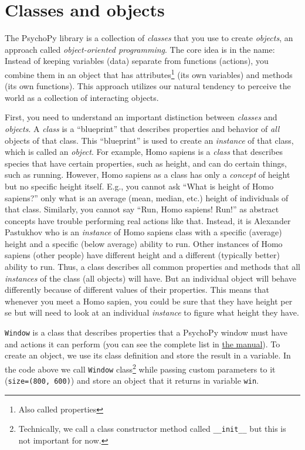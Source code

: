 \documentclass[
]{book}
\begin{document}
\hypertarget{classes-and-objects}{%
\section{Classes and objects}\label{classes-and-objects}}

The PsychoPy library is a collection of \emph{classes} that you use to create \emph{objects}, an approach called \emph{object-oriented programming}. The core idea is in the name: Instead of keeping variables (data) separate from functions (actions), you combine them in an object that has attributes\footnote{Also called properties} (its own variables) and methods (its own functions). This approach utilizes our natural tendency to perceive the world as a collection of interacting objects.

First, you need to understand an important distinction between \emph{classes} and \emph{objects}. A \emph{class} is a ``blueprint'' that describes properties and behavior of \emph{all} objects of that class. This ``blueprint'' is used to create an \emph{instance} of that class, which is called an \emph{object}. For example, Homo sapiens is a \emph{class} that describes species that have certain properties, such as height, and can do certain things, such as running. However, Homo sapiens as a class has only a \emph{concept} of height but no specific height itself. E.g., you cannot ask ``What is height of Homo sapiens?'' only what is an average (mean, median, etc.) height of individuals of that class. Similarly, you cannot say ``Run, Homo sapiens! Run!'' as abstract concepts have trouble performing real actions like that. Instead, it is Alexander Pastukhov who is an \emph{instance} of Homo sapiens class with a specific (average) height and a specific (below average) ability to run. Other instances of Homo sapiens (other people) have different height and a different (typically better) ability to run. Thus, a class describes all common properties and methods that all \emph{instances} of the class (all objects) will have. But an individual object will behave differently because of different values of their properties. This means that whenever you meet a Homo sapien, you could be sure that they have height per se but will need to look at an individual \emph{instance} to figure what height they have.

\texttt{Window} is a class that describes properties that a PsychoPy window must have and actions it can perform (you can see the complete list in \href{https://psychopy.org/api/visual/window.html\#psychopy.visual.Window}{the manual}). To create an object, we use its class definition and store the result in a variable. In the code above we call \texttt{Window} class\footnote{Technically, we call a class constructor method called \texttt{\_\_init\_\_} but this is not important for now.} while passing custom parameters to it (\texttt{size=(800,\ 600)}) and store an object that it returns in variable \texttt{win}.
\end{document}
